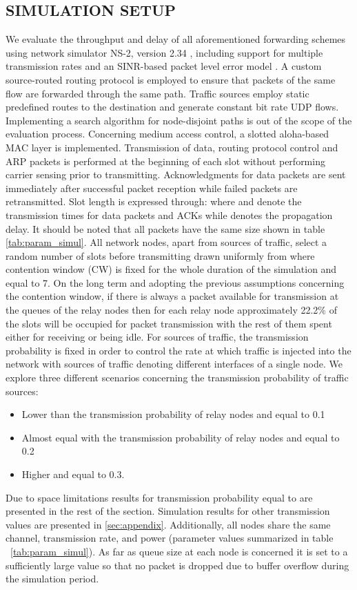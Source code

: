 \documentclass[journal, onecolumn, 12pt]{IEEEtran}
\begin{document}
\subsection{\uppercase{Simulation Setup}}
\label{sec:sim_setup}
We evaluate the throughput and delay of all aforementioned forwarding schemes  using network simulator NS-2, version 2.34 \cite{ref:ns2}, including support for multiple transmission rates and an SINR-based packet
level error model \cite{ref:dei80211mr}.
A custom source-routed routing protocol is employed to ensure that packets of the same flow are forwarded through the same path.
Traffic sources employ static predefined routes to the destination and generate constant bit rate UDP flows.
Implementing a search algorithm for node-disjoint paths is out of the scope of the evaluation process.
Concerning medium access control, a slotted aloha-based MAC layer is implemented.
Transmission of data, routing protocol control and ARP packets is performed at the beginning of each slot without performing carrier sensing prior to transmitting.
Acknowledgments for data packets are sent immediately after successful packet reception while failed packets are retransmitted.
Slot length  is expressed through:  where  and  denote the transmission times for data packets and ACKs while  denotes the propagation delay.
It should be noted that all packets have the same size shown in table \ref{tab:param_simul}.
All network nodes, apart from sources of traffic, select a random number of slots before transmitting drawn uniformly from  where contention window (CW) is fixed for the whole duration of the simulation and equal to 7.
On the long term and adopting the previous assumptions concerning the contention window, if there is always a packet available for transmission at the queues of the relay nodes then for each relay node approximately 22.2\% of the slots will be occupied for packet transmission
with the rest of them spent either for receiving or being idle.
For sources of traffic, the transmission probability is fixed in order to control the rate at which traffic is injected into the network with sources of traffic denoting different
interfaces of a single node.
We explore three different scenarios concerning the transmission probability of traffic sources:
\begin{itemize}
\item Lower than the transmission probability of relay nodes and equal to 0.1
\item Almost equal with the transmission probability of relay nodes and equal to 0.2
\item Higher and equal to 0.3.
\end{itemize}
Due to space limitations results for transmission probability equal to  are presented in the rest of the section.
Simulation results for other transmission values are presented in \ref{sec:appendix}.
Additionally, all nodes share the same channel, transmission rate, and power (parameter values summarized in table ~\ref{tab:param_simul}).
As far as queue size at each node is concerned it is set to a sufficiently large value so that no packet is dropped due to buffer overflow during the simulation period.
\end{document}
